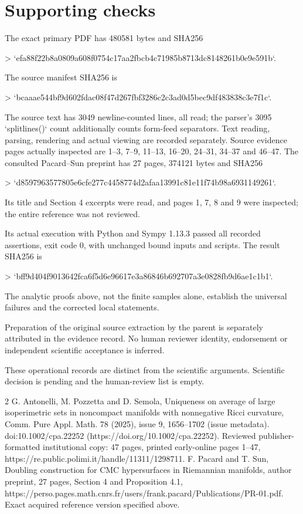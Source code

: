 \documentclass[10pt]{article}
\begin{document}
\section*{Supporting checks}
The exact primary PDF has 480581 bytes and SHA256\par
> `efa88f22b8a0809a608f0754c17aa2fbcb4c71985b8713dc8148261b0e9e591b`.\par
The source manifest SHA256 is\par
> `bcaaae544bf9d602fdac08f47d267fbf3286c2c3ad0d5bec9df483838c3e7f1c`.\par
The source text has 3049 newline-counted lines, all read; the parser’s 3095 `splitlines()` count additionally counts form-feed separators. Text reading, parsing, rendering and actual viewing are recorded separately. Source evidence pages actually inspected are 1–3, 7–9, 11–13, 16–20, 24–31, 34–37 and 46–47. The consulted Pacard–Sun preprint has 27 pages, 374121 bytes and SHA256\par
> `d8597963577805e6cfe277c4458774d2afaa13991c81e11f74b98a6931149261`.\par
Its title and Section 4 excerpts were read, and pages 1, 7, 8 and 9 were inspected; the entire reference was not reviewed.\par
Its actual execution with Python and Sympy 1.13.3 passed all recorded assertions, exit code 0, with unchanged bound inputs and scripts. The result SHA256 is\par
> `bff9d404f9013642fca6f5d6e96617e3a86846b692707a3e0828fb9d6ae1c1b1`.\par
The analytic proofs above, not the finite samples alone, establish the universal failures and the corrected local statements.\par
Preparation of the original source extraction by the parent is separately attributed in the evidence record. No human reviewer identity, endorsement or independent scientific acceptance is inferred.\par
These operational records are distinct from the scientific arguments. Scientific decision is pending and the human-review list is empty.\par
2 G. Antonelli, M. Pozzetta and D. Semola, Uniqueness on average of large isoperimetric sets in noncompact manifolds with nonnegative Ricci curvature, Comm. Pure Appl. Math. 78 (2025), issue 9, 1656–1702 (issue metadata). doi:10.1002/cpa.22252 (https://doi.org/10.1002/cpa.22252). Reviewed publisher-formatted institutional copy: 47 pages, printed early-online pages 1–47, https://re.public.polimi.it/handle/11311/1298711. F. Pacard and T. Sun, Doubling construction for CMC hypersurfaces in Riemannian manifolds, author preprint, 27 pages, Section 4 and Proposition 4.1, https://perso.pages.math.cnrs.fr/users/frank.pacard/Publications/PR-01.pdf. Exact acquired reference version specified above.\par
\end{document}
